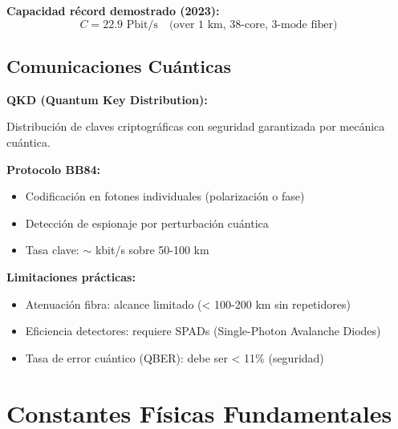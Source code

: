 \documentclass[11pt,a4paper]{article}
\begin{document}
\textbf{Capacidad récord demostrado (2023):}
\begin{equation}
    C = 22.9 \text{ Pbit/s} \quad \text{(over 1 km, 38-core, 3-mode fiber)}
\end{equation}

\subsection{Comunicaciones Cuánticas}

\textbf{QKD (Quantum Key Distribution):}

Distribución de claves criptográficas con seguridad garantizada por mecánica cuántica.

\textbf{Protocolo BB84:}
\begin{itemize}
    \item Codificación en fotones individuales (polarización o fase)
    \item Detección de espionaje por perturbación cuántica
    \item Tasa clave: $\sim$ kbit/s sobre 50-100 km
\end{itemize}

\textbf{Limitaciones prácticas:}
\begin{itemize}
    \item Atenuación fibra: alcance limitado (< 100-200 km sin repetidores)
    \item Eficiencia detectores: requiere SPADs (Single-Photon Avalanche Diodes)
    \item Tasa de error cuántico (QBER): debe ser < 11\% (seguridad)
\end{itemize}

\appendix
\section{Constantes Físicas Fundamentales}
\end{document}
